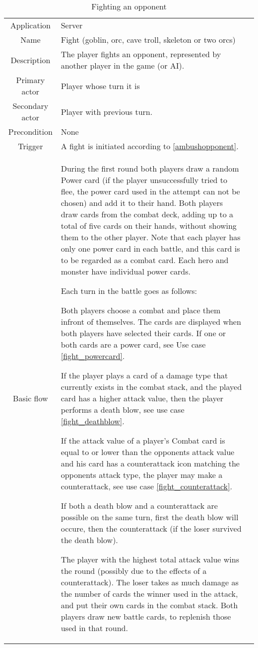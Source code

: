 \begin{table}
\caption{Fighting an opponent}
\label{fightopponent}
\begin{tabular}{|c| p{9cm}|c}
\hline
Application & Server & \\
Name & Fight (goblin, orc, cave troll, skeleton or two orcs) & \\
Description & The player fights an opponent, represented by another player in the game (or AI). & \\
Primary actor & Player whose turn it is & \\
Secondary actor & Player with previous turn. & \\
Precondition & None & \\
Trigger & A fight is initiated according to \ref{ambushopponent}. & \\ \hline
Basic flow & During the first round both players draw a random Power card (if the player unsuccessfully tried to flee, the power card used in the attempt can not be chosen) and add it to their hand. Both players draw cards from the combat deck, adding up to a total of five cards on their hands, without showing them to the other player. Note that each player has only one power card in each battle, and this card is to be regarded as a combat card. Each hero and monster have individual power cards.

Each turn in the battle goes as follows:

Both players choose a combat and place them infront of themselves. The cards are displayed when both players have selected their cards. If one or both cards are a power card, see Use case \ref{fight_powercard}.

If the player plays a card of a damage type that currently exists in the combat stack, and the played card has a higher attack value, then the player performs a death blow, see use case \ref{fight_deathblow}.

If the attack value of a player's Combat card is equal to or lower than the opponents attack value and his card has a counterattack icon matching the opponents attack type, the player may make a counterattack, see use case \ref{fight_counterattack}.

If both a death blow and a counterattack are possible on the same turn, first the death blow will occure, then the counterattack (if the loser survived the death blow).

The player with the highest total attack value wins the round (possibly due to the effects of a counterattack). The loser takes as much damage as the number of cards the winner used in the attack, and put their own cards in the combat stack. Both players draw new battle cards, to replenish those used in that round.


\end{tabular}
\end{table}
